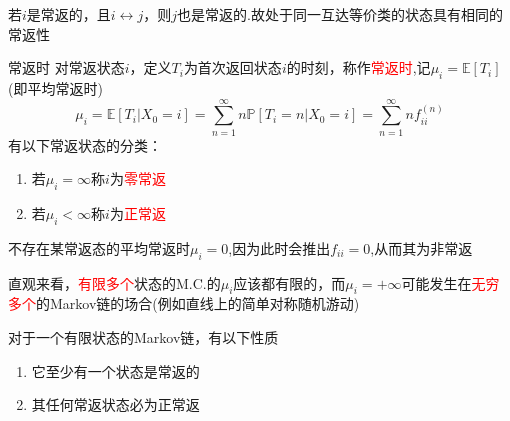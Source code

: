 \documentclass{elegantbook}
\newcommand\p{\mathbb{P}}
\newcommand\E{\mathbb{E}}
\begin{document}
\begin{corollary}{}{}
    若$i$是常返的，且$i\leftrightarrow j$，则$j$也是常返的.故处于同一互达等价类的状态具有相同的常返性
\end{corollary}
\begin{definition}{常返时}{}
    对常返状态$i$，定义$T_i$为首次返回状态$i$的时刻，称作\textcolor{red}{常返时},记$\mu _i=\E [T_i]$(即平均常返时)
    \[\mu _i=\E[T_i|X_0=i]=\sum_{n=1}^{\infty}n\p[T_i=n|X_0=i]=\sum_{n=1}^{\infty}nf_{ii}^{(n)}\]
    有以下常返状态的分类：
    \begin{enumerate}
        \item 若$\mu _i=\infty$称$i$为\textcolor{red}{零常返}
        \item 若$\mu _i<\infty$称$i$为\textcolor{red}{正常返}
    \end{enumerate}
    不存在某常返态的平均常返时$\mu _i=0$,因为此时会推出$f_{ii}=0$,从而其为非常返
\end{definition}
\begin{remark}
    直观来看，\textcolor{red}{有限多个}状态的M.C.的$\mu _i$应该都有限的，而$\mu _i=+\infty$可能发生在\textcolor{red}{无穷多个}的Markov链的场合(例如直线上的简单对称随机游动)
\end{remark}
\begin{proposition}{}{}
    对于一个有限状态的Markov链，有以下性质
    \begin{enumerate}
        \item 它至少有一个状态是常返的
        \item 其任何常返状态必为正常返
    \end{enumerate}
\end{proposition}
\end{document}
